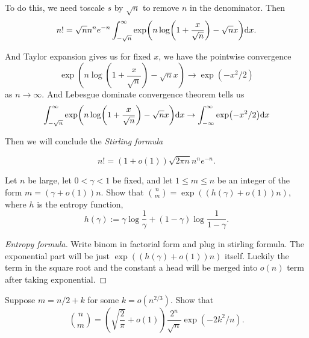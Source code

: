To do this, we need toscale $s$ by $\sqrt{n}$ to remove $n$ in the denominator. Then 
\begin{equation*}
    n! = \sqrt{n}n^n e^{-n} \int_{-\sqrt{n} }^{\infty } \exp (n\log(1+\frac{x}{\sqrt{n} })-\sqrt{n}x )\mathrm{d} x.
\end{equation*}

And Taylor expansion gives us for fixed $x$, we have the pointwise convergence
\begin{equation}
    \exp(n\log(1+\frac{x}{\sqrt{n} })-\sqrt{n}x) \to \exp(-x^2/2)
\end{equation}
as $n\to \infty$. And Lebesgue dominate convergence theorem tells us 
\begin{equation*}
    \int_{-\sqrt{n} }^{ \infty} \exp(n\log(1+\frac{x}{\sqrt{n} })-\sqrt{n}x)\mathrm{d} x \to \int^{\infty}_{-\infty} \exp(-x^2/2)\mathrm{d} x
\end{equation*}

Then we will conclude the \textit{Stirling formula}
\begin{theorem}
    \begin{equation}
        n! = (1+o(1))\sqrt{2\pi n} n^n e^{-n}.
    \end{equation}
\end{theorem}

\begin{example}
    Let $n$ be large, let $0<\gamma<1$ be fixed, and let $1\leq m\leq n$ be an integer of the form $m=(\gamma+o(1))n$.
    Show that $\binom{n}{m}=\exp((h(\gamma)+o(1))n)$, where $h$ is the entropy function,
    \begin{equation*}
        h(\gamma) := \gamma \log \frac{1}{\gamma} +(1-\gamma) \log \frac{1}{1-\gamma}.
    \end{equation*}
\end{example}
\begin{proof}[Entropy formula]
    Write binom in factorial form and plug in stirling formula. The exponential part will be just $\exp((h(\gamma)+o(1))n)$ itself. 
    Luckily the term in the square root and the constant a head will be merged into $o(n)$ term after taking exponential.
\end{proof}
\begin{example}
    Suppose $m = n/2+k$ for some $k=o(n^{2/3})$. Show that
    \begin{equation}
        \binom{n}{m} = (\sqrt{\frac{2}{\pi }} +o(1))\frac{2^n}{\sqrt{n} }\exp(-2k^2/n).
    \end{equation}
\end{example}

